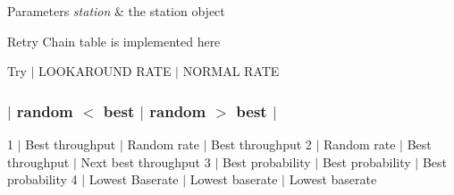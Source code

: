 \begin{DoxyParams}{Parameters}
{\em station} & the station object\\
\hline
\end{DoxyParams}
Retry Chain table is implemented here

Try $\vert$ L\+O\+O\+K\+A\+R\+O\+U\+ND R\+A\+TE $\vert$ N\+O\+R\+M\+AL R\+A\+TE \subsubsection*{$\vert$ random $<$ best $\vert$ random $>$ best $\vert$ }

1 $\vert$ Best throughput $\vert$ Random rate $\vert$ Best throughput 2 $\vert$ Random rate $\vert$ Best throughput $\vert$ Next best throughput 3 $\vert$ Best probability $\vert$ Best probability $\vert$ Best probability 4 $\vert$ Lowest Baserate $\vert$ Lowest baserate $\vert$ Lowest baserate

